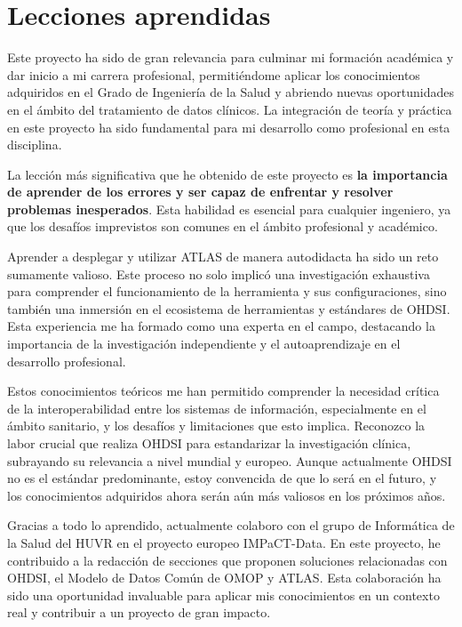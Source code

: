 \section{Lecciones aprendidas}

Este proyecto ha sido de gran relevancia para culminar mi formación académica y dar inicio a mi carrera profesional, permitiéndome aplicar los conocimientos adquiridos en el Grado de Ingeniería de la Salud y abriendo nuevas oportunidades en el ámbito del tratamiento de datos clínicos. La integración de teoría y práctica en este proyecto ha sido fundamental para mi desarrollo como profesional en esta disciplina.

La lección más significativa que he obtenido de este proyecto es \textbf{la importancia de aprender de los errores y ser capaz de enfrentar y resolver problemas inesperados}. Esta habilidad es esencial para cualquier ingeniero, ya que los desafíos imprevistos son comunes en el ámbito profesional y académico.

Aprender a desplegar y utilizar ATLAS de manera autodidacta ha sido un reto sumamente valioso. Este proceso no solo implicó una investigación exhaustiva para comprender el funcionamiento de la herramienta y sus configuraciones, sino también una inmersión en el ecosistema de herramientas y estándares de OHDSI. Esta experiencia me ha formado como una experta en el campo, destacando la importancia de la investigación independiente y el autoaprendizaje en el desarrollo profesional.

Estos conocimientos teóricos me han permitido comprender la necesidad crítica de la interoperabilidad entre los sistemas de información, especialmente en el ámbito sanitario, y los desafíos y limitaciones que esto implica. Reconozco la labor crucial que realiza OHDSI para estandarizar la investigación clínica, subrayando su relevancia a nivel mundial y europeo. Aunque actualmente OHDSI no es el estándar predominante, estoy convencida de que lo será en el futuro, y los conocimientos adquiridos ahora serán aún más valiosos en los próximos años.

Gracias a todo lo aprendido, actualmente colaboro con el grupo de Informática de la Salud del HUVR en el proyecto europeo IMPaCT-Data. En este proyecto, he contribuido a la redacción de secciones que proponen soluciones relacionadas con OHDSI, el Modelo de Datos Común de OMOP y ATLAS. Esta colaboración ha sido una oportunidad invaluable para aplicar mis conocimientos en un contexto real y contribuir a un proyecto de gran impacto.

